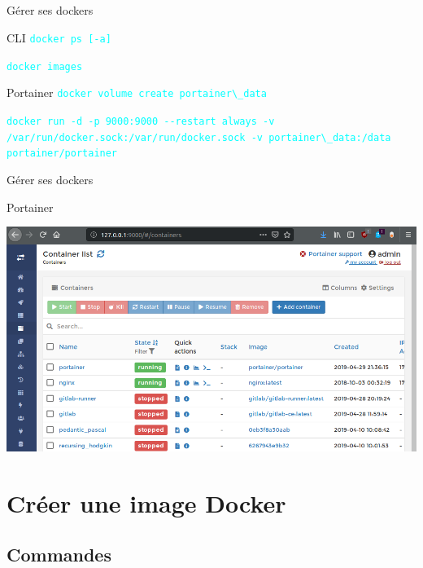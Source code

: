 \documentclass{beamer}
\begin{document}
\subsection{}

\begin{frame}[fragile]{Gérer ses dockers}
\begin{block}{CLI}
\textcolor{cyan}{\verb?docker ps [-a]?}

\textcolor{cyan}{\verb?docker images?}
\end{block}

\begin{block}{Portainer}
\textcolor{cyan}{\verb?docker volume create portainer\_data?}

\textcolor{cyan}{\verb?docker run -d -p 9000:9000 --restart always -v /var/run/docker.sock:/var/run/docker.sock -v portainer\_data:/data portainer/portainer?}
\end{block}
\end{frame}


\begin{frame}[fragile]{Gérer ses dockers}
\begin{block}{Portainer}
\begin{center}
\includegraphics[width=1.0\linewidth]{images/portainer}
\end{center}
\end{block}
\end{frame}

\section{Créer une image Docker}

\subsection{Commandes}
\end{document}
